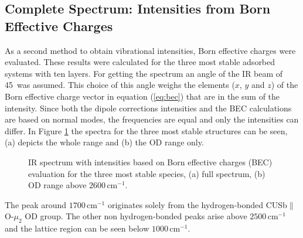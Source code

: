 \documentclass[11pt,DIV=13,BCOR=5mm,a4paper,headinclude]{scrbook}
\begin{document}
\subsection{Complete Spectrum: Intensities from Born Effective Charges}\label{bec}
As a second method to obtain vibrational intensities, Born effective charges were evaluated.
These results were calculated for the three most stable adsorbed systems with ten layers.
For getting the spectrum an angle of the IR beam of 45\textdegree~was assumed.
This choice of this angle weighs the elements ($x$, $y$ and $z$) of the Born effective charge vector in equation (\ref{eq:bec}) that are in the sum of the intensity.
Since both the dipole corrections intensities and the BEC calculations are based on normal modes, the frequencies are equal and only the intensities can differ.
In Figure \ref{abb:bec} the spectra for the three most stable structures can be seen, (a) depicts the whole range and (b) the OD range only.
\begin{figure}[!h]
    \centering
             \quad
             \caption{IR spectrum with intensities based on Born effective charges (BEC) evaluation for the three most stable species, (a) full spectrum, (b) OD range above $2600\,$cm$^{-1}$.}
            \label{abb:bec}
     \end{figure}
The peak around $1700\,$cm$^{-1}$ originates solely from the hydrogen-bonded CUSb$\parallel$O-$\mu_2$ OD group.
The other non hydrogen-bonded peaks arise above $2500\,$cm$^{-1}$ and the lattice region can be seen below $1000\,$cm$^{-1}$.
\end{document}
